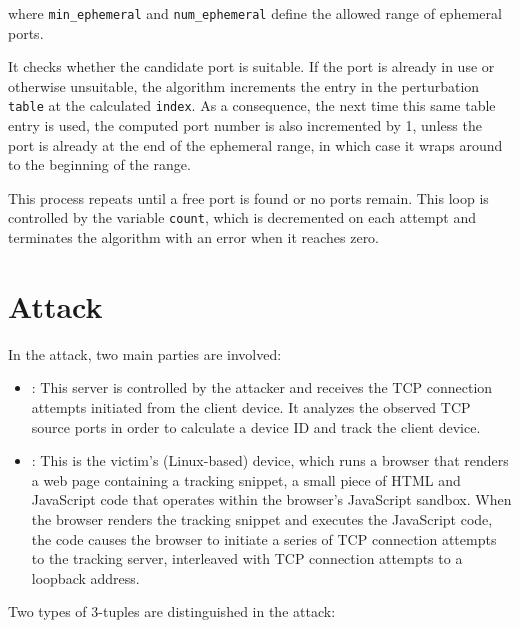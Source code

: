 \documentclass[twocolumn]{report}
\begin{document}
where \texttt{min\_ephemeral} and \texttt{num\_ephemeral} define the allowed range of ephemeral ports.

It checks whether the candidate port is suitable. If the port is already in use or otherwise unsuitable, the algorithm increments the entry in the perturbation \texttt{table} at the calculated \texttt{index}. As a consequence, the next time this same table entry is used, the computed port number is also \alert{incremented by 1}, unless the port is already at the end of the ephemeral range, in which case it wraps around to the beginning of the range.

This process \alert{repeats until} a free port is found or no ports remain. This loop is controlled by the variable \texttt{count}, which is decremented on each attempt and terminates the algorithm with an error when it reaches zero.



\section{Attack}
\label{sec:attack}

In the attack, two main parties are involved:

\begin{itemize}
	\item {}: This server is controlled by the \alert{attacker} and receives the TCP connection attempts initiated from the client device. It analyzes the observed TCP source ports in order to calculate a device ID and track the client device.%

	\item {}: This is the \alert{victim’s} (Linux-based) device, which runs a browser that renders a web page containing a \alert{tracking snippet}, a small piece of HTML and JavaScript code that operates within the browser’s JavaScript sandbox. When the browser renders the tracking snippet and executes the JavaScript code, the code causes the browser to initiate a series of TCP connection attempts to the \alert{tracking server}, interleaved with TCP connection attempts to a \alert{loopback address}.
\end{itemize}

Two \alert{types of 3-tuples} are distinguished in the attack:
\end{document}
